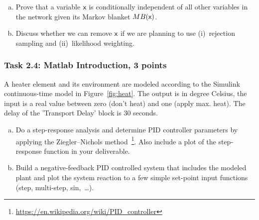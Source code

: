 \documentclass[12pt,a4paper,oneside]{article}
\begin{document}
\begin{enumerate}[a)]
\item Prove that a variable $\rv{x}$ is conditionally independent of all other
  variables in the network given its Markov blanket $MB(\rv{x})$.
\item Discuss whether we can remove $\rv{x}$ if we are planning to use
  (i)~rejection sampling and (ii)~likelihood weighting.
\end{enumerate}

%
%
\subsubsection*{Task 2.4: Matlab Introduction, 3 points}
A heater element and its environment are modeled according to the Simulink
continuous-time model in Figure~\ref{fig:heat}. The output is in degree
Celsius, the input is a real value between zero (don't heat) and one (apply
max. heat). The delay of the 'Transport Delay' block is 30 seconds.

\begin{enumerate}[a)]
\item Do a step-response analysis and determine PID controller parameters by
  applying the Ziegler–Nichols
  method~\footnote{\url{https://en.wikipedia.org/wiki/PID_controller}}.  Also
  include a plot of the step-response function in your deliverable.
\item Build a negative-feedback PID controlled system that includes the modeled
  plant and plot the system reaction to a few simple set-point input functions
  (step, multi-step, sin,~\ldots).
\end{enumerate}
\end{document}
